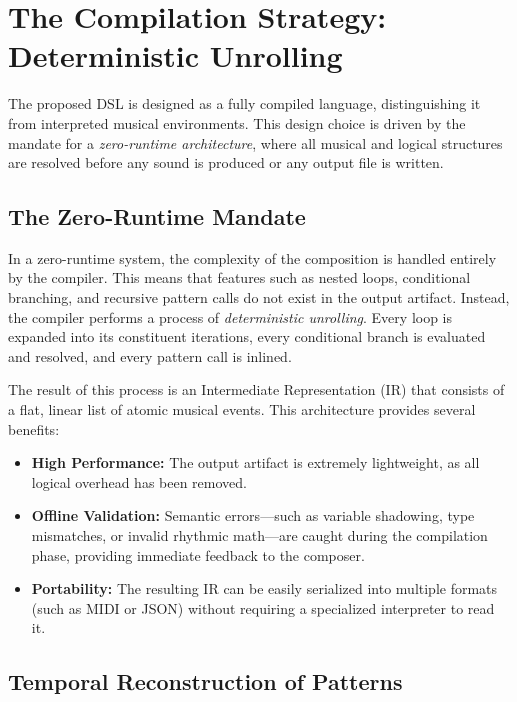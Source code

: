 \section{The Compilation Strategy: Deterministic Unrolling}\label{sec:compilation-strategy}

The proposed DSL is designed as a fully compiled language, distinguishing it from interpreted musical environments.
This design choice is driven by the mandate for a \textit{zero-runtime architecture}, where all musical and logical
structures are resolved before any sound is produced or any output file is written.

\subsection{The Zero-Runtime Mandate}\label{subsec:the-zero-runtime-mandate}

In a zero-runtime system, the complexity of the composition is handled entirely by the compiler.
This means that features such as nested loops, conditional branching, and recursive pattern calls do not exist in the
output artifact.
Instead, the compiler performs a process of \textit{deterministic unrolling}.
Every loop is expanded into its constituent iterations, every conditional branch is evaluated and resolved, and every
pattern call is inlined.

The result of this process is an Intermediate Representation (IR) that consists of a flat, linear list of atomic musical
events.
This architecture provides several benefits:
\begin{itemize}
  \item \textbf{High Performance:} The output artifact is extremely lightweight, as all logical overhead has been
    removed.
  \item \textbf{Offline Validation:} Semantic errors—such as variable shadowing, type mismatches, or invalid rhythmic
    math—are caught during the compilation phase, providing immediate feedback to the composer.
  \item \textbf{Portability:} The resulting IR can be easily serialized into multiple formats (such as MIDI or JSON)
    without requiring a specialized interpreter to read it.
\end{itemize}

\subsection{Temporal Reconstruction of Patterns}\label{subsec:temporal-reconstruction-of-patterns}

